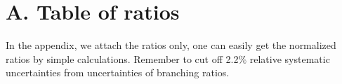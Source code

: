 \clearpage
\section*{A. Table of ratios}
\label{Table of ratios}
In the appendix, we attach the ratios only, one can easily get the normalized ratios by simple calculations. Remember to cut off 2.2$\%$ relative systematic uncertainties from uncertainties of branching ratios.




